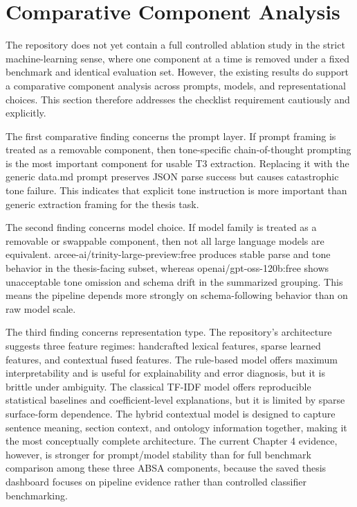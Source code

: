 \section{Comparative Component Analysis}

The repository does not yet contain a full controlled ablation study in the strict machine-learning sense, where one component at a time is removed under a fixed benchmark and identical evaluation set. However, the existing results do support a comparative component analysis across prompts, models, and representational choices. This section therefore addresses the checklist requirement cautiously and explicitly.

The first comparative finding concerns the prompt layer. If prompt framing is treated as a removable component, then tone-specific chain-of-thought prompting is the most important component for usable T3 extraction. Replacing it with the generic data.md prompt preserves JSON parse success but causes catastrophic tone failure. This indicates that explicit tone instruction is more important than generic extraction framing for the thesis task.

The second finding concerns model choice. If model family is treated as a removable or swappable component, then not all large language models are equivalent. arcee-ai/trinity-large-preview:free produces stable parse and tone behavior in the thesis-facing subset, whereas openai/gpt-oss-120b:free shows unacceptable tone omission and schema drift in the summarized grouping. This means the pipeline depends more strongly on schema-following behavior than on raw model scale.

The third finding concerns representation type. The repository’s architecture suggests three feature regimes: handcrafted lexical features, sparse learned features, and contextual fused features. The rule-based model offers maximum interpretability and is useful for explainability and error diagnosis, but it is brittle under ambiguity. The classical TF-IDF model offers reproducible statistical baselines and coefficient-level explanations, but it is limited by sparse surface-form dependence. The hybrid contextual model is designed to capture sentence meaning, section context, and ontology information together, making it the most conceptually complete architecture. The current Chapter 4 evidence, however, is stronger for prompt/model stability than for full benchmark comparison among these three ABSA components, because the saved thesis dashboard focuses on pipeline evidence rather than controlled classifier benchmarking.

